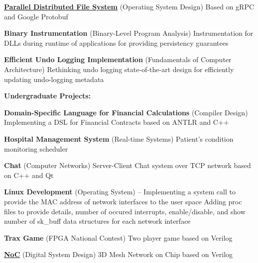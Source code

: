 \documentclass[a4paper,9pt,oneside]{article}
\begin{document}
\begin{body}
\BulletItem
\href{https://github.com/arminvakil/PFS}
{\textbf{Parallel Distributed File System}}
(Operating System Design)
\hfill
{}
\SubBulletItem
Based on gRPC and Google Protobuf

\BulletItem
\textbf{Binary Instrumentation}
(Binary-Level Program Analysis)
\hfill
{}
\SubBulletItem
Instrumentation for DLLs during runtime of applications for providing persistency guarantees

\BulletItem
{\textbf{Efficient Undo Logging Implementation}}
(Fundamentals of Computer Architecture)
\hfill
{}
\SubBulletItem
Rethinking undo logging state-of-the-art design for efficiently updating undo-logging metadata

\textbf{Undergraduate Projects:}

\BulletItem
\textbf{Domain-Specific Language for Financial Calculations} (Compiler Design)
\hfill
{}
\SubBulletItem
Implementing a DSL for Financial Contracts based on ANTLR and C++

\BulletItem
\textbf{Hospital Management System} (Real-time Systems)
\hfill
{}
\SubBulletItem
Patient's condition monitoring scheduler


\BulletItem
\textbf{Chat} (Computer Networks)
\hfill
{}
\SubBulletItem
Server-Client Chat system over TCP network based on C++ and Qt

\BulletItem
\textbf{Linux Development} (Operating System)
\hfill
{} -- 
\SubBulletItem
Implementing a system call to provide the MAC address of network interfaces to the user space
\SubBulletItem
Adding proc files to provide details, number of occured interrupts, enable/disable, and show number of sk\_buff data structures for each network interface

\BulletItem
\textbf{Trax Game} (FPGA National Contest)
\hfill
{}
\SubBulletItem
Two player game based on Verilog

\BulletItem
\href{https://github.com/arminvakil/NoC}
{\textbf{NoC}} (Digital System Design)
\hfill
{}
\SubBulletItem
3D Mesh Network on Chip based on Verilog


\end{body}
\end{document}
